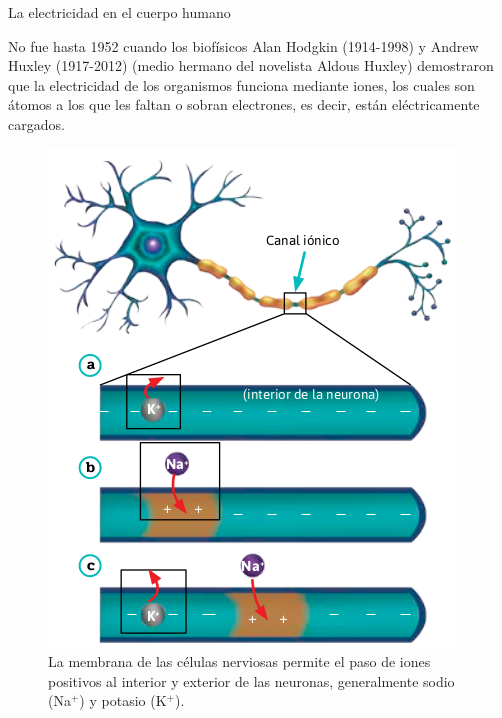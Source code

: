 \begin{sectionbox}{La electricidad en el cuerpo humano}
\begin{minipage}{0.55\textwidth}
        No fue hasta 1952 cuando los biofísicos Alan
        Hodgkin (1914-1998) y Andrew Huxley (1917-2012)
        (medio hermano del novelista Aldous Huxley) demostraron que la electricidad de los organismos funciona mediante iones, los cuales
        son átomos a los que les faltan o sobran electrones, es
        decir, están eléctricamente cargados.

    \end{minipage}\hfill
    \begin{minipage}{0.42\textwidth}
        \begin{figure}[H]
            \centering
            \includegraphics[width=0.95\linewidth]{../images/20230502034142}
            \caption{La membrana de las células nerviosas permite el
                paso de iones positivos al interior y exterior de las neuronas,
                generalmente sodio (Na$^+$) y potasio (K$^+$).}
            \label{fig:20230502034142}
        \end{figure}
    \end{minipage}


\end{sectionbox}
